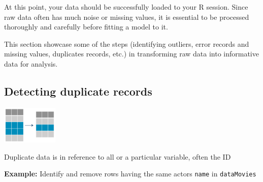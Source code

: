 \documentclass[a4paper]{article}\usepackage[]{graphicx}\usepackage[]{xcolor}
\begin{document}
\noindent At this point, your data should be successfully loaded to your R session. Since raw data often has much noise or missing values, it is essential to be processed thoroughly and carefully before fitting a model to it. \vspace{1em}

\noindent This section showcase some of the steps (identifying outliers, error records and missing values, duplicates records, etc.) in transforming raw data into informative data for analysis. \vspace{1em}

\subsection{Detecting duplicate records}

\begin{center}
\includegraphics[width = 0.2\textwidth]{./image/deduplication.png}    
\end{center} 
\noindent Duplicate data is in reference to all or a particular variable, often the ID \vspace{1em}

\noindent \textbf{Example:} Identify and remove rows having the same actors \texttt{name} in \texttt{dataMovies} \vspace{1em} 
\end{document}
